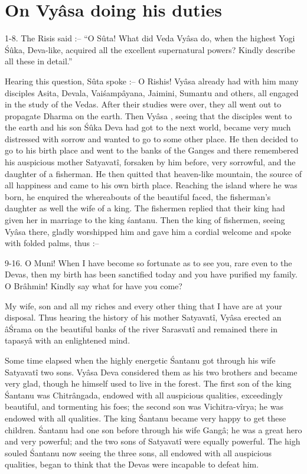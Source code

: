 \chapter{On Vy\^asa  doing his duties}

1-8. The Risis said :-- ``O S\^uta! What did Veda Vy\^asa  do, when the highest Yogi \'S\^uka, Deva-like, acquired all the excellent supernatural powers? Kindly describe all these in detail.''

Hearing this question, S\^uta spoke :-- O Rishis! Vy\^asa  already had with him many disciples Asita, Devala, Vai\'samp\^ayana, Jaimini, Sumantu and others, all engaged in the study of the Vedas. After their studies were over, they all went out to propagate Dharma on the earth. Then Vy\^asa , seeing that the disciples went to the earth and his son \'S\^uka Deva had got to the next world, became very much distressed with sorrow and wanted to go to some other place. He then decided to go to his birth place and went to the banks of the Ganges and there remembered his auspicious mother Satyavat\^i, forsaken by him before, very sorrowful, and the daughter of a fisherman. He then quitted that heaven-like mountain, the source of all happiness and came to his own birth place. Reaching the island where he was born, he enquired the whereabouts of the beautiful faced, the fisherman's daughter as well the wife of a king. The fishermen replied that their king had given her in marriage to the king \'santanu. Then the king of fishermen, seeing Vy\^asa there, gladly worshipped him and gave him a cordial welcome and spoke with folded palms, thus :--

9-16. O Muni! When I have become so fortunate as to see you, rare even to the Devas, then my birth has been sanctified today and you have purified my family. O Br\^ahmin! Kindly say what for have you come?

My wife, son and all my riches and every other thing that I have are at your disposal. Thus hearing the history of his mother Satyavat\^i, Vy\^asa  erected an \^a\'Srama on the beautiful banks of the river Sarasvat\^i and remained there in tapasy\^a with an enlightened mind.

Some time elapsed when the highly energetic \'Santanu got through his wife Satyavat\^i two sons. Vy\^asa  Deva considered them as his two brothers and became very glad, though he himself used to live in the forest. The first son of the king \'Santanu was Chitr\^angada, endowed with all auspicious qualities, exceedingly beautiful, and tormenting his foes; the second son was Vichitra-v\^irya; he was endowed with all qualities. The king \'Santanu became very happy to get these children. \'Santanu had one son before through his wife Gang\^a; he was a great hero and very powerful; and the two sons of Satyavat\^i were equally powerful. The high souled \'Santanu now seeing the three sons, all endowed with all auspicious qualities, began to think that the Devas were incapable to defeat him.

